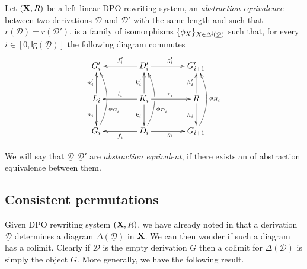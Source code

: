 \documentclass[a4paper,UKenglish,cleveref,pdftex, thm-restate,numberwithinsect]{lipics}
\newcommand{\Deltamin}{\Delta^{\hspace{-1pt}\downarrow\hspace{-1pt}}}
\def\R{\mathsf{R}}
\def\X{\textbf {\textup{X}}}
\newcommand{\dder}[1]{\mathscr{#1}}
\newcommand{\der}[1]{\underline{\dder{#1}}}
\newcommand{\lgh}[0]{\mathsf{lg}}
\begin{document}
\begin{definition}Let $(\X, \R)$ be a left-linear DPO rewriting system,  an \emph{abstraction equivalence} between two derivations $\der{D}$ and $\der{D'}$ with the same length and such that $r(\der{D})=r(\der{D}')$, is a family of isomorphisms $\{\phi_X\}_{X\in \Deltamin(\der{D})}$ such that, for every $i\in [0, \lgh(\der{D})]$ the following diagram commutes
	\[\xymatrix@C=40pt{G'_i&D'_i \ar[r]^{g'_i} \ar[l]_{f'_i}&G'_{i+1}\\  L_i \ar[u]^{n'_i} \ar[d]_{n_i}& K_i \ar[u]^{k'_i} \ar[d]_{k_i} \ar[r]^{r_i} \ar[l]_{l_i} &R\ar[u]^{h'_i} \ar[d]_{h_i}\\G_i \ar@/_.45cm/[uu]_(.35){\phi_{G_i}}|\hole&D_i\ar[l]^{f_i}\ar@/_.45cm/[uu]_(.35){\phi_{D_i}}|\hole \ar[r]_{g_i}&G_{i+1}\ar@/_.45cm/[uu]_{\phi_{H_i}}}\]

We will say that  $\der{D}$ $\der{D}'$  are \emph{abstraction equivalent}, if there exists an of abstraction equivalence between them.
\end{definition}

\iffalse 

\subsection{Consistent permutations}

Given DPO rewriting system $(\X, \R)$,  we have already noted in  that a derivation $\der{D}$  determines a diagram $\Delta(\der{D})$ in $\X$. We can then wonder if such a diagram has a colimit. Clearly if $\der{D}$ is the empty derivation $G$ then a colimit for $\Delta(\der{D})$ is simply the object $G$. More generally, we have the following result.
\end{document}
